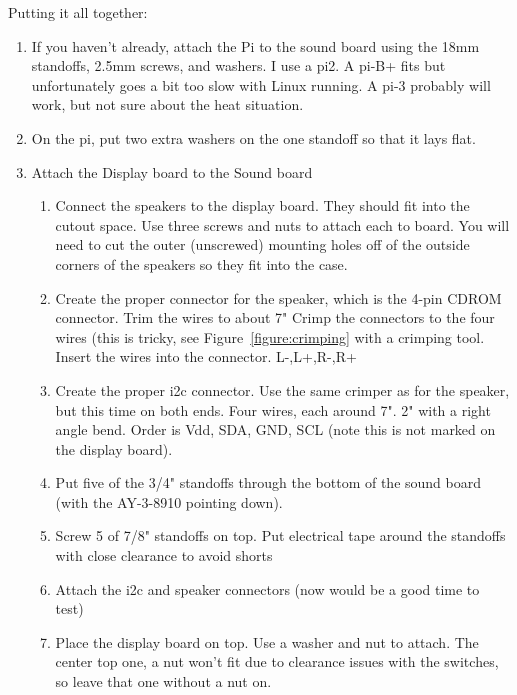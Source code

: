 \documentclass[11pt]{article}
\begin{document}
Putting it all together:
\begin{enumerate}

	\item If you haven't already, attach the Pi to the sound board using the 
		18mm standoffs, 2.5mm screws, and washers.
		I use a pi2.
		A pi-B+ fits but unfortunately goes a bit too slow with Linux running.
		A pi-3 probably will work, but not sure about the heat situation.

	\item	On the pi, put two extra washers on the one standoff so that it lays
			flat.

	\item Attach the Display board to the Sound board

		\begin{enumerate}
		
		\item Connect the speakers to the display board.
			They should fit into the cutout space.
			Use three screws and nuts to attach each to board.
			You will need to cut the outer (unscrewed) mounting holes
			off of the outside corners of the speakers so they fit into
			the case.

		\item Create the proper connector for the speaker, which is the 4-pin CDROM
			connector.  Trim the wires to about 7"
			Crimp the connectors to the four wires (this is tricky, see
			Figure~\ref{figure:crimping} with a crimping tool.
			Insert the wires into the connector. L-,L+,R-,R+

		\item Create the proper i2c connector.
			Use the same crimper as for the speaker, but this time on both
			ends.  Four wires, each around 7".  2" with a right angle bend.
			Order is Vdd, SDA, GND, SCL (note this is not marked on
			the display board).

		\item Put five of the 3/4" standoffs through the bottom of the sound board
			(with the AY-3-8910 pointing down).

		\item Screw 5 of 7/8" standoffs on top.
			Put electrical tape around the standoffs with close clearance
			to avoid shorts

		\item Attach the i2c and speaker connectors (now would be a good time to test)

		\item Place the display board on top.
			Use a washer and nut to attach.
			The center top one, a nut won't fit due to clearance issues with
			the switches, so leave that one without a nut on.


\end{enumerate}
\end{enumerate}
\end{document}
